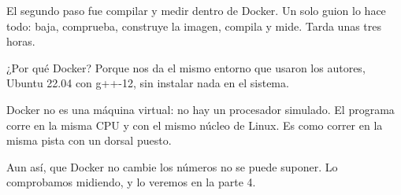 El segundo paso fue compilar y medir dentro de Docker. Un solo guion lo hace todo: baja, comprueba, construye la imagen, compila y mide. Tarda unas tres horas.

¿Por qué Docker? Porque nos da el mismo entorno que usaron los autores, Ubuntu 22.04 con g++-12, sin instalar nada en el sistema.

Docker no es una máquina virtual: no hay un procesador simulado. El programa corre en la misma CPU y con el mismo núcleo de Linux. Es como correr en la misma pista con un dorsal puesto.

Aun así, que Docker no cambie los números no se puede suponer. Lo comprobamos midiendo, y lo veremos en la parte 4.
